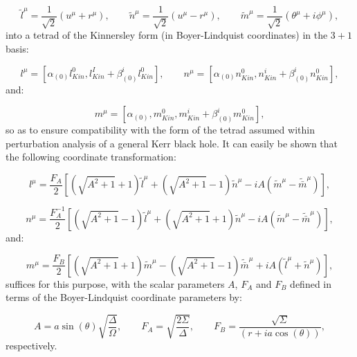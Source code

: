 \documentclass{article}
\begin{document}
\begin{equation}
\tilde{l}^{\mu} = \frac{1}{\sqrt{2}} \left( u^{\mu} + r^{\mu} \right), \qquad \tilde{n}^{\mu} = \frac{1}{\sqrt{2}} \left( u^{\mu} - r^{\mu} \right), \qquad \tilde{m}^{\mu} = \frac{1}{\sqrt{2}} \left( \theta^{\mu} + i \phi^{\mu} \right),
\end{equation}
into a tetrad of the Kinnersley form (in Boyer-Lindquist coordinates) in the ${3 + 1}$ basis:

\begin{equation}
l^{\mu} = \left[ \alpha_{\left( 0 \right)} l_{Kin}^{0}, l_{Kin}^I + \beta_{\left( 0 \right)}^{i} l_{Kin}^{0} \right], \qquad n^{\mu} = \left[ \alpha_{\left( 0 \right)} n_{Kin}^{0}, n_{Kin}^{i} + \beta_{\left( 0 \right)}^{i} n_{Kin}^{0} \right],
\end{equation}
and:

\begin{equation}
m^{\mu} = \left[ \alpha_{\left(0 \right)}, m_{Kin}^{0}, m_{Kin}^{i} + \beta_{\left( 0 \right)}^{i} m_{Kin}^{0} \right],
\end{equation}
so as to ensure compatibility with the form of the tetrad assumed within perturbation analysis of a general Kerr black hole. It can easily be shown that the following coordinate transformation:

\begin{equation}
l^{\mu} = \frac{F_A}{2} \left[ \left( \sqrt{A^2 + 1} + 1 \right) \tilde{l}^{\mu} + \left( \sqrt{A^2 + 1} - 1 \right) \tilde{n}^{\mu} - i A \left( \tilde{m}^{\mu} - \tilde{\bar{m}}^{\mu} \right) \right],
\end{equation}

\begin{equation}
n^{\mu} = \frac{F_{A}^{-1}}{2} \left[ \left( \sqrt{A^2 + 1} - 1 \right) \tilde{l}^{\mu} + \left( \sqrt{A^2 + 1} + 1 \right) \tilde{n}^{\mu} - i A \left( \tilde{m}^{\mu} - \tilde{\bar{m}}^{\mu} \right) \right],
\end{equation}
and:

\begin{equation}
m^{\mu} = \frac{F_B}{2} \left[ \left( \sqrt{A^2 + 1} + 1 \right) \tilde{m}^{\mu} - \left( \sqrt{A^2 + 1} - 1 \right) \tilde{\bar{m}}^{\mu} + i A \left( \tilde{l}^{\mu} + \tilde{n}^{\mu} \right) \right],
\end{equation}
suffices for this purpose, with the scalar parameters $A$, ${F_A}$ and ${F_B}$ defined in terms of the Boyer-Lindquist coordinate parameters by:

\begin{equation}
A = a \sin \left( \theta \right) \sqrt{\frac{\Delta}{\Omega}}, \qquad F_A = \sqrt{\frac{2 \Sigma}{\Delta}}, \qquad F_B = \frac{\sqrt{\Sigma}}{\left( r + i a \cos \left( \theta \right) \right)},
\end{equation}
respectively.
\end{document}

